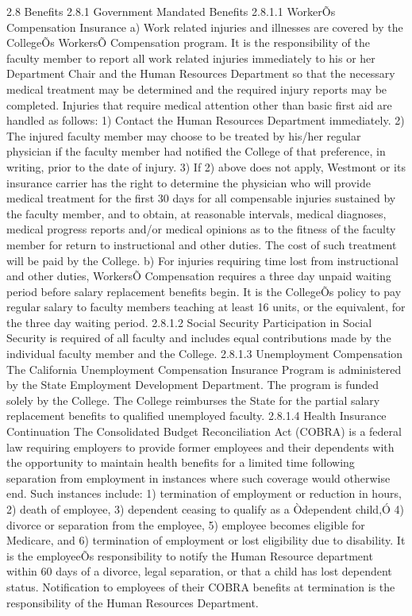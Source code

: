 \documentclass[letterpaper, 11pt]{article}
\begin{document}
	2.8 Benefits
	2.8.1 Government Mandated Benefits
	2.8.1.1 WorkerÕs Compensation Insurance
	a) Work related injuries and illnesses are covered by the CollegeÕs WorkersÕ Compensation program.  It is the responsibility of the faculty member to report all work related injuries immediately to his or her Department Chair and the Human Resources Department so that the necessary medical treatment may be determined and the required injury reports may be completed. Injuries that require medical attention other than basic first aid are handled as follows:
	1) Contact the Human Resources Department immediately.
	2) The injured faculty member may choose to be treated by his/her regular physician if the faculty member had notified the College of that preference, in writing, prior to the date of injury.
	3) If 2) above does not apply, Westmont or its insurance carrier has the right to determine the physician who will provide medical treatment for the first 30 days for all compensable injuries sustained by the faculty member, and to obtain, at reasonable intervals, medical diagnoses, medical progress reports and/or medical opinions as to the fitness of the faculty member for return to instructional and other duties.  The cost of such treatment will be paid by the College.
	b) For injuries requiring time lost from instructional and other duties, WorkersÕ Compensation requires a three day unpaid waiting period before salary replacement benefits begin.  It is the CollegeÕs policy to pay regular salary to faculty members teaching at least 16 units, or the equivalent, for the three day waiting period.
	2.8.1.2 Social Security
	Participation in Social Security is required of all faculty and includes equal contributions made by the individual faculty member and the College.
	2.8.1.3 Unemployment Compensation
	The California Unemployment Compensation Insurance Program is administered by the State Employment Development Department.  The program is funded solely by the College. The College reimburses the State for the partial salary replacement benefits to qualified unemployed faculty.
	2.8.1.4 Health Insurance Continuation
	The Consolidated Budget Reconciliation Act (COBRA) is a federal law requiring employers to provide former employees and their dependents with the opportunity to maintain health benefits for a limited time following separation from employment in instances where such coverage would otherwise end.  Such instances include:  1) termination of employment or reduction in hours, 2) death of employee, 3) dependent ceasing to qualify as a Òdependent child,Ó 4) divorce or separation from the employee, 5) employee becomes eligible for Medicare, and 6) termination of employment or lost eligibility due to disability.  It is the employeeÕs responsibility to notify the Human Resource department within 60 days of a divorce, legal separation, or that a child has lost dependent status.  Notification to employees of their COBRA benefits at termination is the responsibility of the Human Resources Department.
\end{document}
